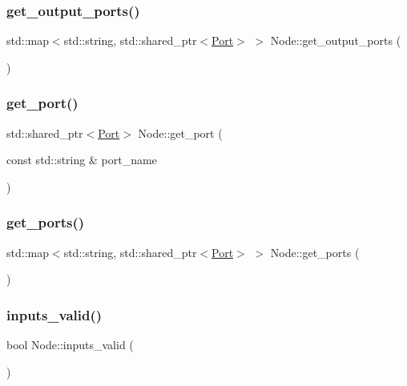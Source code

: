 \subsubsection{\texorpdfstring{get\+\_\+output\+\_\+ports()}{get\_output\_ports()}}
{\footnotesize\ttfamily std\+::map$<$std\+::string, std\+::shared\+\_\+ptr$<$\hyperlink{class_port}{Port}$>$ $>$ Node\+::get\+\_\+output\+\_\+ports (\begin{DoxyParamCaption}{ }\end{DoxyParamCaption})}

\mbox{\label{class_node_a71b857799058e56ccb9593a69fc675bc}} 
\subsubsection{\texorpdfstring{get\+\_\+port()}{get\_port()}}
{\footnotesize\ttfamily std\+::shared\+\_\+ptr$<$\hyperlink{class_port}{Port}$>$ Node\+::get\+\_\+port (\begin{DoxyParamCaption}\item[{const std\+::string \&}]{port\+\_\+name }\end{DoxyParamCaption})}

\mbox{\label{class_node_a90fc0096ba3a5094f0696dde1dd5b08d}} 
\subsubsection{\texorpdfstring{get\+\_\+ports()}{get\_ports()}}
{\footnotesize\ttfamily std\+::map$<$std\+::string, std\+::shared\+\_\+ptr$<$\hyperlink{class_port}{Port}$>$ $>$ Node\+::get\+\_\+ports (\begin{DoxyParamCaption}{ }\end{DoxyParamCaption})}

\mbox{\label{class_node_adb04f5aa8b454b19db663b3f240e9061}} 
\subsubsection{\texorpdfstring{inputs\+\_\+valid()}{inputs\_valid()}}
{\footnotesize\ttfamily bool Node\+::inputs\+\_\+valid (\begin{DoxyParamCaption}{ }\end{DoxyParamCaption})}

